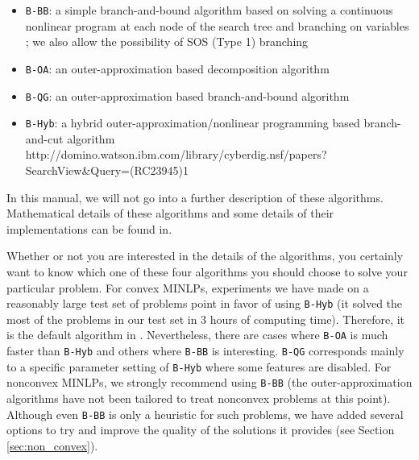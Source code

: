 \begin{itemize}
\item {\tt B-BB}: a simple branch-and-bound algorithm based on solving
a continuous nonlinear program at each node of the search tree and
branching on variables ;
we also allow the possibility of SOS (Type 1) branching
\item {\tt B-OA}: an outer-approximation based decomposition algorithm
{\begin{rawhtml}
[<A
 HREF="bonmin_UsersManual.html#DG">3</A>,<A
 HREF="http://dx.doi.org/10.1007/BF01581153">4</A>]
\end{rawhtml}}
\item {\tt B-QG}: an outer-approximation based branch-and-bound
algorithm
\item {\tt B-Hyb}: a hybrid outer-approximation/nonlinear programming
based branch-and-cut algorithm 
{http://domino.watson.ibm.com/library/cyberdig.nsf/papers?SearchView&Query=(RC23945)}{1}
\end{itemize}

In this manual,  we will not go into a further description of these algorithms.
Mathematical details of these algorithms
and some details of their implementations can be found in.

Whether or not you are interested in the details of the algorithms, you certainly
want to know which one of these four algorithms you should choose to solve
your particular problem.
For convex MINLPs, experiments we have made on a reasonably large test set of problems point in favor of using {\tt B-Hyb}
(it solved the most of the problems in our test set in 3 hours of computing time).
Therefore, it is the default algorithm in \Bonmin.
Nevertheless, there are cases where {\tt B-OA} is much faster than {\tt B-Hyb} and others where {\tt B-BB} is interesting.
{\tt B-QG} corresponds mainly to a specific parameter setting of {\tt B-Hyb} where some features are disabled.
For nonconvex MINLPs, we strongly recommend using {\tt B-BB} (the outer-approximation algorithms
have not been tailored to treat nonconvex problems at this point). Although even {\tt B-BB} is only a
heuristic for such problems, we have added several
options to try and improve the quality of the solutions it provides (see Section \ref{sec:non_convex}).

